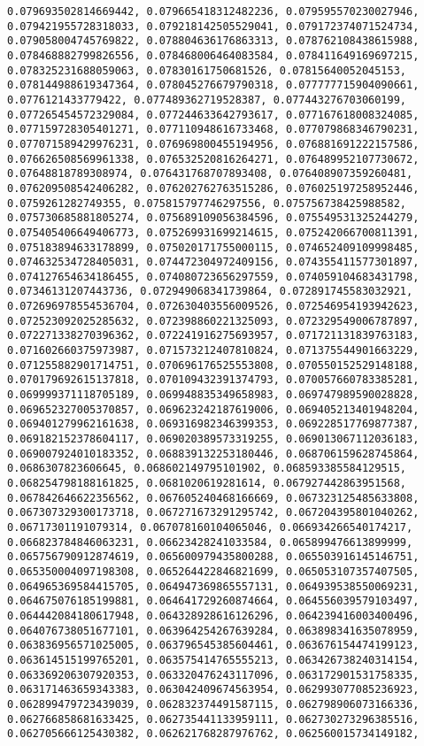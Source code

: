 \documentclass[11pt]{article}
\begin{document}
\begin{Verbatim}[commandchars=\\\{\}]
0.079693502814669442, 0.079665418312482236, 0.079595570230027946, 0.079421955728318033, 0.079218142505529041, 0.079172374071524734, 0.079058004745769822, 0.078804636176863313, 0.078762108438615988, 0.078468882799826556, 0.078468006464083584, 0.078411649169697215, 0.078325231688059063, 0.07830161750681526, 0.07815640052045153, 0.078144988619347364, 0.078045276679790318, 0.077777715904090661, 0.0776121433779422, 0.077489362719528387, 0.077443276703060199, 0.077265454572329084, 0.077244633642793617, 0.077167618008324085, 0.077159728305401271, 0.077110948616733468, 0.077079868346790231, 0.077071589429976231, 0.076969800455194956, 0.076881691222157586, 0.076626508569961338, 0.076532520816264271, 0.076489952107730672, 0.07648818789308974, 0.076431768707893408, 0.076408907359260481, 0.076209508542406282, 0.076202762763515286, 0.076025197258952446, 0.0759261282749355, 0.075815797746297556, 0.075756738425988582, 0.075730685881805274, 0.075689109056384596, 0.075549531325244279, 0.075405406649406773, 0.075269931699214615, 0.075242066700811391, 0.075183894633178899, 0.075020171755000115, 0.074652409109998485, 0.074632534728405031, 0.074472304972409156, 0.074355411577301897, 0.074127654634186455, 0.074080723656297559, 0.074059104683431798, 0.07346131207443736, 0.072949068341739864, 0.072891745583032921, 0.072696978554536704, 0.072630403556009526, 0.072546954193942623, 0.072523092025285632, 0.072398860221325093, 0.072329549006787897, 0.072271338270396362, 0.072241916275693957, 0.071721131839763183, 0.071602660375973987, 0.071573212407810824, 0.071375544901663229, 0.071255882901714751, 0.070696176525553808, 0.070550152529148188, 0.070179692615137818, 0.070109432391374793, 0.070057660783385281, 0.069999371118705189, 0.069948835349658983, 0.069747989590028828, 0.069652327005370857, 0.069623242187619006, 0.069405213401948204, 0.069401279962161638, 0.069316982346399353, 0.069228517769877387, 0.069182152378604117, 0.069020389573319255, 0.069013067112036183, 0.069007924010183352, 0.068839132253180446, 0.068706159628745864, 0.0686307823606645, 0.068602149795101902, 0.068593385584129515, 0.068254798188161825, 0.0681020619281614, 0.067927442863951568, 0.067842646622356562, 0.067605240468166669, 0.067323125485633808, 0.067307329300173718, 0.067271673291295742, 0.067204395801040262, 0.06717301191079314, 0.067078160104065046, 0.066934266540174217, 0.066823784846063231, 0.06623428241033584, 0.065899476613899999, 0.065756790912874619, 0.065600979435800288, 0.065503916145146751, 0.065350004097198308, 0.065264422846821699, 0.065053107357407505, 0.064965369584415705, 0.064947369865557131, 0.064939538550069231, 0.064675076185199881, 0.064641729260874664, 0.064556039579103497, 0.064442084180617948, 0.064328928616126296, 0.064239416003400496, 0.064076738051677101, 0.063964254267639284, 0.063898341635078959, 0.063836956571025005, 0.063796545385604461, 0.063676154474199123, 0.063614515199765201, 0.063575414765555213, 0.063426738240314154, 0.063369206307920353, 0.063320476243117096, 0.063172901531758335, 0.063171463659343383, 0.063042409674563954, 0.062993077085236923, 0.062899479723439039, 0.062832374491587115, 0.062798906073166336, 0.062766858681633425, 0.062735441133959111, 0.062730273296385516, 0.062705666125430382, 0.062621768287976762, 0.062560015734149182, 
\end{Verbatim}
\end{document}
